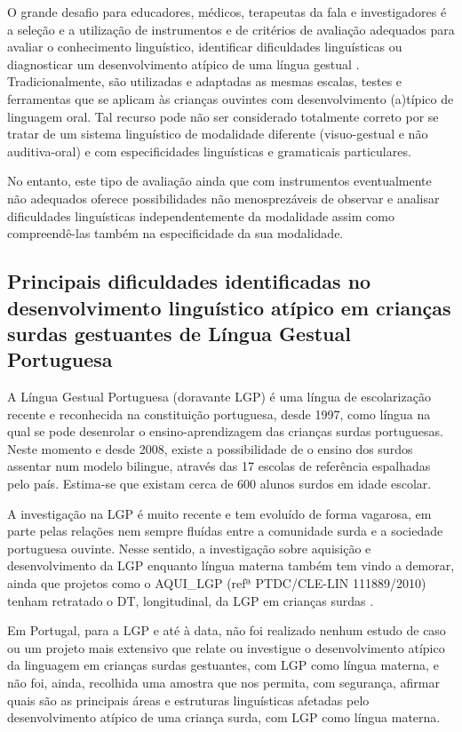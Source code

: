 \documentclass[output=paper,colorlinks,citecolor=brown,booklanguage=portuguese]{langscibook}
\begin{document}
O grande desafio para educadores, médicos, terapeutas da fala e investigadores é a seleção e a utilização de instrumentos e de critérios de avaliação adequados para avaliar o conhecimento linguístico, identificar dificuldades linguísticas ou diagnosticar um desenvolvimento atípico de uma língua gestual \citet{Henner2018}. Tradicionalmente, são utilizadas e adaptadas as mesmas escalas, testes e ferramentas que se aplicam às crianças ouvintes com desenvolvimento (a)típico de linguagem oral. Tal recurso pode não ser considerado totalmente correto por se tratar de um sistema linguístico de modalidade diferente (visuo-gestual e não auditiva-oral) e com especificidades linguísticas e gramaticais particulares.

No entanto, este tipo de avaliação ainda que com instrumentos eventualmente não adequados oferece possibilidades não menosprezáveis de observar e analisar dificuldades linguísticas independentemente da modalidade assim como compre\-endê-las também na especificidade da sua modalidade.

\subsection{Principais dificuldades identificadas no desenvolvimento linguístico atípico em crianças surdas gestuantes de Língua Gestual Portuguesa}

A Língua Gestual Portuguesa (doravante LGP) é uma língua de escolarização recente e reconhecida na constituição portuguesa, desde 1997, como língua na qual se pode desenrolar o ensino-aprendizagem das crianças surdas portuguesas. Neste momento e desde 2008, existe a possibilidade de o ensino dos surdos assentar num modelo bilingue, através das 17 escolas de referência espalhadas pelo país. Estima-se que existam cerca de 600 alunos surdos em idade escolar. 

A investigação na LGP é muito recente e tem evoluído de forma vagarosa, em parte pelas relações nem sempre fluídas entre a comunidade surda e a sociedade portuguesa ouvinte. Nesse sentido, a investigação sobre aquisição e desenvolvimento da LGP enquanto língua materna também tem vindo a demorar, ainda que projetos como o AQUI\_LGP (refª PTDC/CLE-LIN 111889/2010) tenham retratado o DT, longitudinal, da LGP em crianças surdas \citep{Carmo2013}. 

Em Portugal, para a LGP e até à data, não foi realizado nenhum estudo de caso ou um projeto mais extensivo que relate ou investigue o desenvolvimento atípico da linguagem em crianças surdas gestuantes, com LGP como língua materna, e não foi, ainda, recolhida uma amostra que nos permita, com segurança, afirmar quais são as principais áreas e estruturas linguísticas afetadas pelo desenvolvimento atípico de uma criança surda, com LGP como língua materna.
\end{document}
